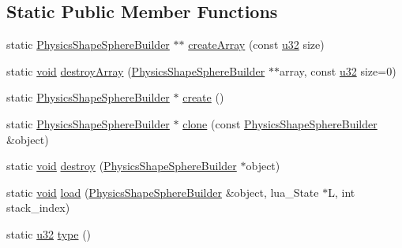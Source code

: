 \subsection*{Static Public Member Functions}
\begin{DoxyCompactItemize}
\item 
static \mbox{\hyperlink{classnjli_1_1_physics_shape_sphere_builder}{Physics\+Shape\+Sphere\+Builder}} $\ast$$\ast$ \mbox{\hyperlink{classnjli_1_1_physics_shape_sphere_builder_acd366ec74bb20ca7237733023457834f}{create\+Array}} (const \mbox{\hyperlink{_util_8h_a10e94b422ef0c20dcdec20d31a1f5049}{u32}} size)
\item 
static \mbox{\hyperlink{_thread_8h_af1e856da2e658414cb2456cb6f7ebc66}{void}} \mbox{\hyperlink{classnjli_1_1_physics_shape_sphere_builder_ac529063dd27a995a69caed14399c09d8}{destroy\+Array}} (\mbox{\hyperlink{classnjli_1_1_physics_shape_sphere_builder}{Physics\+Shape\+Sphere\+Builder}} $\ast$$\ast$array, const \mbox{\hyperlink{_util_8h_a10e94b422ef0c20dcdec20d31a1f5049}{u32}} size=0)
\item 
static \mbox{\hyperlink{classnjli_1_1_physics_shape_sphere_builder}{Physics\+Shape\+Sphere\+Builder}} $\ast$ \mbox{\hyperlink{classnjli_1_1_physics_shape_sphere_builder_a6d95dd09fe39bf985fa616042eb10cc2}{create}} ()
\item 
static \mbox{\hyperlink{classnjli_1_1_physics_shape_sphere_builder}{Physics\+Shape\+Sphere\+Builder}} $\ast$ \mbox{\hyperlink{classnjli_1_1_physics_shape_sphere_builder_ae1435ea0dbbf0be68a238e248b87b2ce}{clone}} (const \mbox{\hyperlink{classnjli_1_1_physics_shape_sphere_builder}{Physics\+Shape\+Sphere\+Builder}} \&object)
\item 
static \mbox{\hyperlink{_thread_8h_af1e856da2e658414cb2456cb6f7ebc66}{void}} \mbox{\hyperlink{classnjli_1_1_physics_shape_sphere_builder_a24e892e3dba8edb73be8c4bf21c8a655}{destroy}} (\mbox{\hyperlink{classnjli_1_1_physics_shape_sphere_builder}{Physics\+Shape\+Sphere\+Builder}} $\ast$object)
\item 
static \mbox{\hyperlink{_thread_8h_af1e856da2e658414cb2456cb6f7ebc66}{void}} \mbox{\hyperlink{classnjli_1_1_physics_shape_sphere_builder_ac1919aa24e3c726eae892a4e87561c2a}{load}} (\mbox{\hyperlink{classnjli_1_1_physics_shape_sphere_builder}{Physics\+Shape\+Sphere\+Builder}} \&object, lua\+\_\+\+State $\ast$L, int stack\+\_\+index)
\item 
static \mbox{\hyperlink{_util_8h_a10e94b422ef0c20dcdec20d31a1f5049}{u32}} \mbox{\hyperlink{classnjli_1_1_physics_shape_sphere_builder_a87f9f44f646b362c3ba46fcacad3a4d8}{type}} ()
\end{DoxyCompactItemize}
